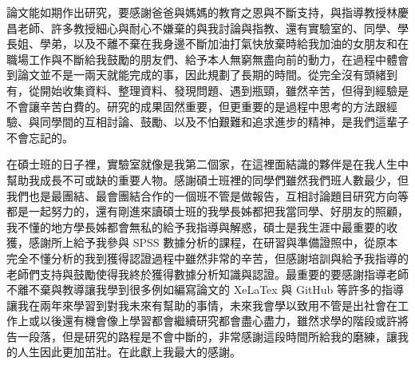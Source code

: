  論文能如期作出研究，要感謝爸爸與媽媽的教育之恩與不斷支持，與指導教授林慶昌老師、許多教授細心與耐心不嫌棄的與我討論與指教、還有實驗室的、同學、學長姐、學弟，以及不離不棄在我身邊不斷加油打氣快放棄時給我加油的女朋友和在職場工作與不斷給我鼓勵的朋友們、給予本人無窮無盡向前的動力，在過程中體會到論文並不是一兩天就能完成的事，因此規劃了長期的時間。從完全沒有頭緒到有，從開始收集資料、整理資料、發現問題、遇到瓶頸，雖然辛苦，但得到經驗是不會讓辛苦白費的。研究的成果固然重要，但更重要的是過程中思考的方法跟經驗、與同學間的互相討論、鼓勵、以及不怕艱難和追求進步的精神，是我們這輩子不會忘記的。

在碩士班的日子裡，實驗室就像是我第二個家，在這裡面結識的夥伴是在我人生中幫助我成長不可或缺的重要人物。感謝碩士班裡的同學們雖然我們班人數最少，但我們也是最團結、最會團結合作的一個班不管是做報告，互相討論題目研究方向等都是一起努力的，還有剛進來讀碩士班的我學長姊都把我當同學、好朋友的照顧，我不懂的地方學長姊都會無私的給予我指導與解惑，碩士是我生涯中最重要的收獲，感謝所上給予我參與 SPSS 數據分析的課程，在研習與準備證照中，從原本完全不懂分析的我到獲得認證過程中雖然非常的辛苦，但感謝培訓與給予我指導的老師們支持與鼓勵使得我終於獲得數據分析知識與認證。最重要的要感謝指導老師不離不棄與教導讓我學到很多例如編寫論文的 XeLaTex 與 GitHub 等許多的指導讓我在兩年來學習到對我未來有幫助的事情，未來我會學以致用不管是出社會在工作上或以後還有機會像上學習都會繼續研究都會盡心盡力，雖然求學的階段或許將告一段落，但是研究的路程是不會中斷的，非常感謝這段時間所給我的磨練，讓我的人生因此更加茁壯。在此獻上我最大的感謝。



